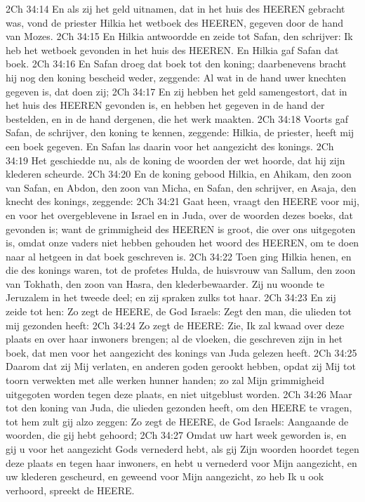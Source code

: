 2Ch 34:14  En als zij het geld uitnamen, dat in het huis des HEEREN gebracht was, vond de priester Hilkia het wetboek des HEEREN, gegeven door de hand van Mozes.
2Ch 34:15  En Hilkia antwoordde en zeide tot Safan, den schrijver: Ik heb het wetboek gevonden in het huis des HEEREN. En Hilkia gaf Safan dat boek.
2Ch 34:16  En Safan droeg dat boek tot den koning; daarbenevens bracht hij nog den koning bescheid weder, zeggende: Al wat in de hand uwer knechten gegeven is, dat doen zij;
2Ch 34:17  En zij hebben het geld samengestort, dat in het huis des HEEREN gevonden is, en hebben het gegeven in de hand der bestelden, en in de hand dergenen, die het werk maakten.
2Ch 34:18  Voorts gaf Safan, de schrijver, den koning te kennen, zeggende: Hilkia, de priester, heeft mij een boek gegeven. En Safan las daarin voor het aangezicht des konings.
2Ch 34:19  Het geschiedde nu, als de koning de woorden der wet hoorde, dat hij zijn klederen scheurde.
2Ch 34:20  En de koning gebood Hilkia, en Ahikam, den zoon van Safan, en Abdon, den zoon van Micha, en Safan, den schrijver, en Asaja, den knecht des konings, zeggende:
2Ch 34:21  Gaat heen, vraagt den HEERE voor mij, en voor het overgeblevene in Israel en in Juda, over de woorden dezes boeks, dat gevonden is; want de grimmigheid des HEEREN is groot, die over ons uitgegoten is, omdat onze vaders niet hebben gehouden het woord des HEEREN, om te doen naar al hetgeen in dat boek geschreven is.
2Ch 34:22  Toen ging Hilkia henen, en die des konings waren, tot de profetes Hulda, de huisvrouw van Sallum, den zoon van Tokhath, den zoon van Hasra, den klederbewaarder. Zij nu woonde te Jeruzalem in het tweede deel; en zij spraken zulks tot haar.
2Ch 34:23  En zij zeide tot hen: Zo zegt de HEERE, de God Israels: Zegt den man, die ulieden tot mij gezonden heeft:
2Ch 34:24  Zo zegt de HEERE: Zie, Ik zal kwaad over deze plaats en over haar inwoners brengen; al de vloeken, die geschreven zijn in het boek, dat men voor het aangezicht des konings van Juda gelezen heeft.
2Ch 34:25  Daarom dat zij Mij verlaten, en anderen goden gerookt hebben, opdat zij Mij tot toorn verwekten met alle werken hunner handen; zo zal Mijn grimmigheid uitgegoten worden tegen deze plaats, en niet uitgeblust worden.
2Ch 34:26  Maar tot den koning van Juda, die ulieden gezonden heeft, om den HEERE te vragen, tot hem zult gij alzo zeggen: Zo zegt de HEERE, de God Israels: Aangaande de woorden, die gij hebt gehoord;
2Ch 34:27  Omdat uw hart week geworden is, en gij u voor het aangezicht Gods vernederd hebt, als gij Zijn woorden hoordet tegen deze plaats en tegen haar inwoners, en hebt u vernederd voor Mijn aangezicht, en uw klederen gescheurd, en geweend voor Mijn aangezicht, zo heb Ik u ook verhoord, spreekt de HEERE.
